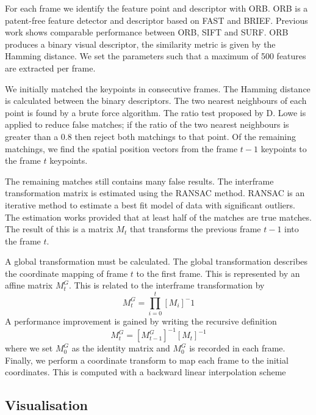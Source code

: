 For each frame we identify the feature point and descriptor with ORB.
ORB is a patent-free feature detector and descriptor based on FAST and BRIEF\cite{Rublee2011}.
Previous work shows comparable performance between ORB, SIFT and SURF\cite{Karami2017}.
ORB produces a binary visual descriptor,
the similarity metric is given by the Hamming distance.
We set the parameters such that a maximum of 500 features are extracted per frame.

We initially matched the keypoints in consecutive frames.
The Hamming distance is calculated between the binary descriptors.
The two nearest neighbours of each point is found by a brute force algorithm.
The ratio test proposed by D. Lowe\cite{Lowe2004} is applied to reduce false matches;
if the ratio of the two nearest neighbours is greater than a 0.8 then reject both matchings to that point.
Of the remaining matchings, we find the spatial position vectors from the frame $t-1$ keypoints to the frame $t$ keypoints.

The remaining matches still contains many false results.
The interframe transformation matrix is estimated using the RANSAC method\cite{Fischler1981}.
RANSAC is an iterative method to estimate a best fit model of data with significant outliers.
The estimation works provided that at least half of the matches are true matches.
The result of this is a matrix $M_t$ that transforms the previous frame $t-1$ into the frame $t$.

A global transformation must be calculated.
The global transformation describes the coordinate mapping of frame $t$ to the first frame.
This is represented by an affine matrix $M^G_t$.
This is related to the interframe transformation by
\begin{equation}
  M^G_t =  \prod^{t}_{i=0}[ M_i ]^-1
\end{equation}
A performance improvement is gained by writing the recursive definition
\begin{equation}
  M^G_t = [M^G_{t-1}]^{-1}[M_t]^{-1}
\end{equation}
where we set $M^G_0$ as the identity matrix and $M^G_0$ is recorded in each frame.
Finally, we perform a coordinate transform to map each frame to the initial coordinates.
This is computed with a backward linear interpolation scheme

\subsection{Visualisation}

